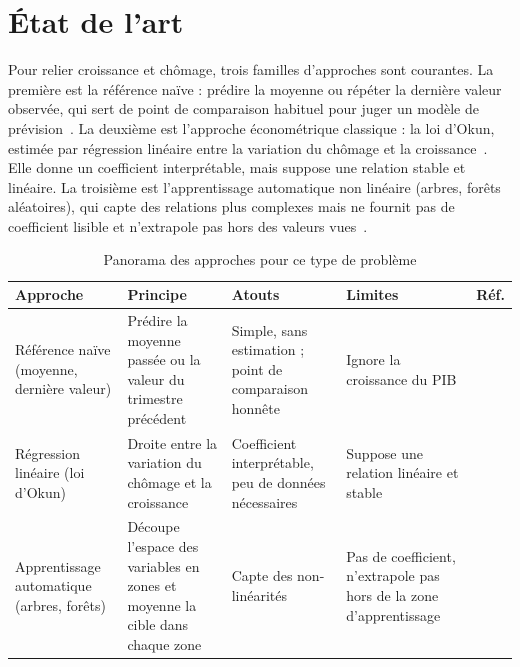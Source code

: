 \documentclass[11pt,a4paper]{article}
\begin{document}
\section{État de l'art}
\label{sec:etat}
Pour relier croissance et chômage, trois familles d'approches sont courantes. La première est la référence naïve : prédire la moyenne ou répéter la dernière valeur observée, qui sert de point de comparaison habituel pour juger un modèle de prévision~\cite{hynd}. La deuxième est l'approche économétrique classique : la loi d'Okun, estimée par régression linéaire entre la variation du chômage et la croissance~\cite{okun,ball,knotek}. Elle donne un coefficient interprétable, mais suppose une relation stable et linéaire. La troisième est l'apprentissage automatique non linéaire (arbres, forêts aléatoires), qui capte des relations plus complexes mais ne fournit pas de coefficient lisible et n'extrapole pas hors des valeurs vues~\cite{hastie}.

\begin{table}[htbp]
  \centering
  \caption{Panorama des approches pour ce type de problème}
  \label{tab:etat}
  \small
  \begin{tabular}{@{}P{3cm} P{4.3cm} P{3.5cm} P{3.5cm} l@{}}
    \toprule
    Approche & Principe & Atouts & Limites & Réf. \\
    \midrule
    Référence naïve (moyenne, dernière valeur) & Prédire la moyenne passée ou la valeur du trimestre précédent & Simple, sans estimation ; point de comparaison honnête & Ignore la croissance du PIB & \cite{hynd} \\
    Régression linéaire (loi d'Okun) & Droite entre la variation du chômage et la croissance & Coefficient interprétable, peu de données nécessaires & Suppose une relation linéaire et stable & \cite{okun,ball} \\
    Apprentissage automatique (arbres, forêts) & Découpe l'espace des variables en zones et moyenne la cible dans chaque zone & Capte des non-linéarités & Pas de coefficient, n'extrapole pas hors de la zone d'apprentissage & \cite{hastie} \\
    \bottomrule
  \end{tabular}
\end{table}

\end{document}
